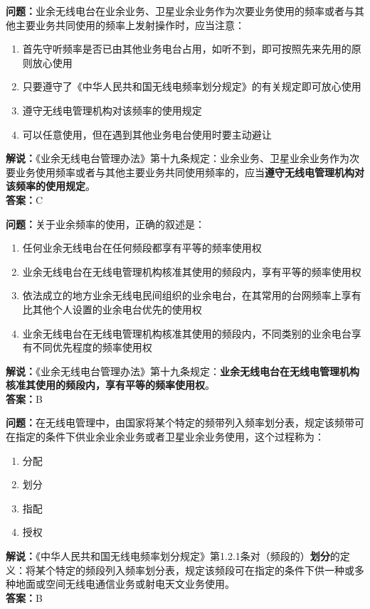 \bigskip


\noindent\textbf{问题：}业余无线电台在业余业务、卫星业余业务作为次要业务使用的频率或者与其他主要业务共同使用的频率上发射操作时，应当注意：
\begin{enumerate}[label=\Alph*), leftmargin=3em]
\item 首先守听频率是否已由其他业务电台占用，如听不到，即可按照先来先用的原则放心使用
\item 只要遵守了《中华人民共和国无线电频率划分规定》的有关规定即可放心使用
\item 遵守无线电管理机构对该频率的使用规定
\item 可以任意使用，但在遇到其他业务电台使用时要主动避让
\end{enumerate}
\noindent\textbf{解说：}《业余无线电台管理办法》第十九条规定：业余业务、卫星业余业务作为次要业务使用频率或者与其他主要业务共同使用频率的，应当\textbf{遵守无线电管理机构对该频率的使用规定}。\\\noindent\textbf{答案：}C



\bigskip


\noindent\textbf{问题：}关于业余频率的使用，正确的叙述是：
\begin{enumerate}[label=\Alph*), leftmargin=3em]
\item 任何业余无线电台在任何频段都享有平等的频率使用权
\item 业余无线电台在无线电管理机构核准其使用的频段内，享有平等的频率使用权
\item 依法成立的地方业余无线电民间组织的业余电台，在其常用的台网频率上享有比其他个人设置的业余电台优先的使用权
\item 业余无线电台在无线电管理机构核准其使用的频段内，不同类别的业余电台享有不同优先程度的频率使用权
\end{enumerate}
\noindent\textbf{解说：}《业余无线电台管理办法》第十九条规定：\textbf{业余无线电台在无线电管理机构核准其使用的频段内，享有平等的频率使用权}。\\\noindent\textbf{答案：}B



\bigskip


\noindent\textbf{问题：}在无线电管理中，由国家将某个特定的频带列入频率划分表，规定该频带可在指定的条件下供业余业余业务或者卫星业余业务使用，这个过程称为：
\begin{enumerate}[label=\Alph*), leftmargin=3em]
\item 分配
\item 划分
\item 指配
\item 授权
\end{enumerate}
\noindent\textbf{解说：}《中华人民共和国无线电频率划分规定》第1.2.1条对（频段的）\textbf{划分}的定义：将某个特定的频段列入频率划分表，规定该频段可在指定的条件下供一种或多种地面或空间无线电通信业务或射电天文业务使用。\\
\textbf{答案：}B


